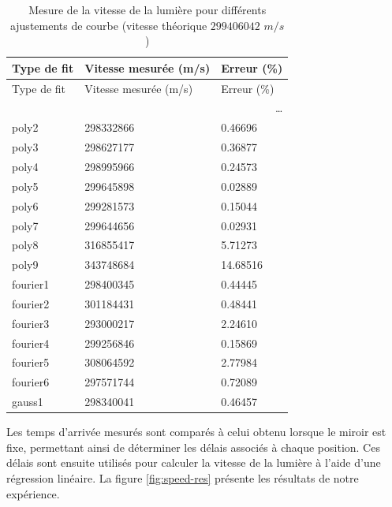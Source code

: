 \begin{onehalfspace}
    \begin{longtable}{p{2.0cm} p{4.0cm} p{2.0cm}}
        \caption{Mesure de la vitesse de la lumière pour différents 
        ajustements de courbe (vitesse théorique
        $299406042$ $m/s$ \cite{hecht2012optics,RefractiveIndexAir})} \\
        \toprule
        \label{table:speed_light}
        Type de fit & Vitesse mesurée (m/s) & Erreur (\%) \\
        \midrule
        \endfirsthead
        
        \toprule
        Type de fit & Vitesse mesurée (m/s) & Erreur (\%) \\
        \midrule
        \endhead
        
        \midrule
        \multicolumn{3}{r}{{\dots}} \\
        \midrule
        \endfoot
        
        \bottomrule
        \endlastfoot
        
        poly2     & 298332866     & 0.46696 \\
        poly3     & 298627177     & 0.36877 \\
        poly4     & 298995966     & 0.24573 \\
        poly5     & 299645898     & 0.02889 \\
        poly6     & 299281573     & 0.15044 \\
        poly7     & 299644656     & 0.02931 \\
        poly8     & 316855417     & 5.71273 \\
        poly9     & 343748684     & 14.68516 \\
        fourier1  & 298400345     & 0.44445 \\
        fourier2  & 301184431     & 0.48441 \\
        fourier3  & 293000217     & 2.24610 \\
        fourier4  & 299256846     & 0.15869 \\
        fourier5  & 308064592     & 2.77984 \\
        fourier6  & 297571744     & 0.72089 \\
        gauss1    & 298340041     & 0.46457
 
    \end{longtable}

    \noindent Les temps d’arrivée mesurés sont comparés à celui obtenu 
    lorsque le miroir est fixe, permettant ainsi de déterminer les délais associés à 
    chaque position. Ces délais sont ensuite utilisés pour calculer la vitesse de la 
    lumière à l’aide d’une régression linéaire. La figure \ref{fig:speed-res} 
    présente les résultats de notre expérience.


\end{onehalfspace}
